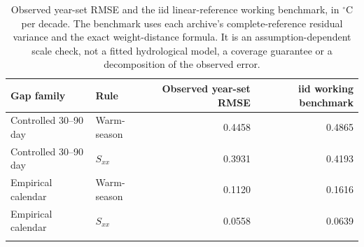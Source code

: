 \begin{table}[t]\centering\small
\caption{Observed year-set RMSE and the iid linear-reference working benchmark, in $^{\circ}$C per decade. The benchmark uses each archive's complete-reference residual variance and the exact weight-distance formula. It is an assumption-dependent scale check, not a fitted hydrological model, a coverage guarantee or a decomposition of the observed error.}
\label{tab:retention-geometry}
\begin{tabular}{llrr}
\toprule
Gap family & Rule & Observed year-set RMSE & iid working benchmark \\
\midrule
Controlled 30--90 day & Warm-season & 0.4458 & 0.4865 \\
Controlled 30--90 day & $S_{xx}$ & 0.3931 & 0.4193 \\
\addlinespace
Empirical calendar & Warm-season & 0.1120 & 0.1616 \\
Empirical calendar & $S_{xx}$ & 0.0558 & 0.0639 \\
\addlinespace
\bottomrule\end{tabular}
\end{table}

